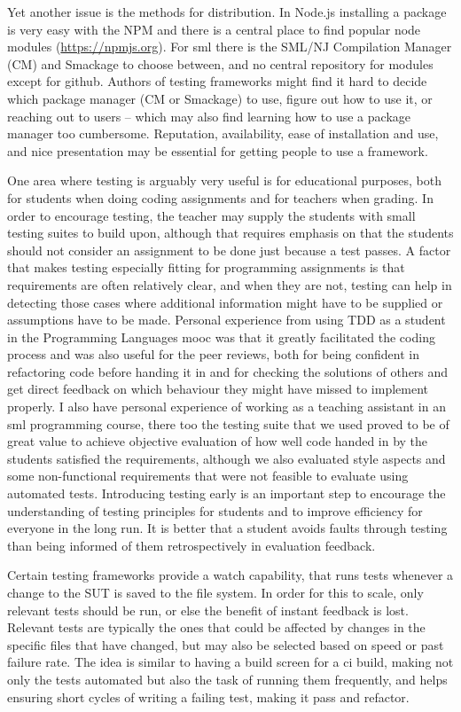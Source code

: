 \documentclass[11pt]{article}
\begin{document}
Yet another issue is the methods for distribution. In Node.js installing a package is very easy with the NPM and there is a central place to find popular node modules (\url{https://npmjs.org}). For \gls{sml} there is the SML/NJ Compilation Manager (CM) and Smackage to choose between, and no central repository for modules except for github. Authors of testing frameworks might find it hard to decide which package manager (CM or Smackage) to use, figure out how to use it, or reaching out to users -- which may also find learning how to use a package manager too cumbersome. Reputation, availability, ease of installation and use, and nice presentation may be essential for getting people to use a framework. %

One area where testing is arguably very useful is for educational purposes, both for students when doing coding assignments and for teachers when grading. In order to encourage testing, the teacher may supply the students with small testing suites to build upon, although that requires emphasis on that the students should not consider an assignment to be done just because a test passes. A factor that makes testing especially fitting for programming assignments is that requirements are often relatively clear, and when they are not, testing can help in detecting those cases where additional information might have to be supplied or assumptions have to be made. Personal experience from using TDD as a student in the Programming Languages \gls{mooc} was that it greatly facilitated the coding process and was also useful for the peer reviews, both for being confident in refactoring code before handing it in and for checking the solutions of others and get direct feedback on which behaviour they might have missed to implement properly. I also have personal experience of working as a teaching assistant in an \gls{sml} programming course, there too the testing suite that we used proved to be of great value to achieve objective evaluation of how well code handed in by the students satisfied the requirements, although we also evaluated style aspects and some non-functional requirements that were not feasible to evaluate using automated tests. Introducing testing early is an important step to encourage the understanding of testing principles for students and to improve efficiency for everyone in the long run. It is better that a student avoids faults through testing than being informed of them retrospectively in evaluation feedback.

Certain testing frameworks provide a watch capability, that runs tests whenever a change to the SUT is saved to the file system. In order for this to scale, only relevant tests should be run, or else the benefit of instant feedback is lost. Relevant tests are typically the ones that could be affected by changes in the specific files that have changed, but may also be selected based on speed or past failure rate. The idea is similar to having a build screen for a \gls{ci} build, making not only the tests automated but also the task of running them frequently, and helps ensuring short cycles of writing a failing test, making it pass and refactor.
\end{document}
